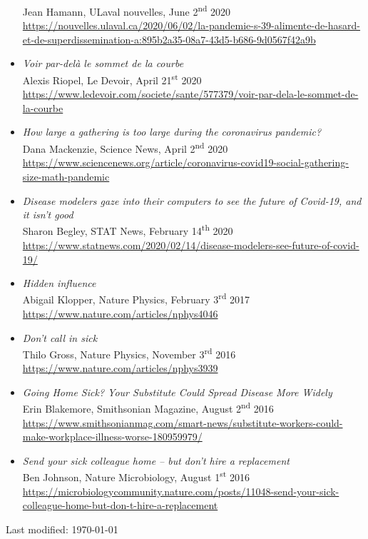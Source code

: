 \documentclass[11pt]{article}
\begin{document}
\begin{itemize}[itemsep=0.5em, first*=\small]
{  {\small Jean Hamann, ULaval nouvelles, June 2\textsuperscript{nd} 2020}\\
  \footnotesize\url{https://nouvelles.ulaval.ca/2020/06/02/la-pandemie-s-39-alimente-de-hasard-et-de-superdissemination-a:895b2a35-08a7-43d5-b686-9d0567f42a9b}}
%
  \item \parbox[t]{0.9\textwidth}{\textit{Voir par-delà le sommet de la courbe}\\
  {\small Alexis Riopel, Le Devoir, April 21\textsuperscript{st} 2020}\\
  \footnotesize\url{https://www.ledevoir.com/societe/sante/577379/voir-par-dela-le-sommet-de-la-courbe}}
%
  \item \parbox[t]{0.9\textwidth}{\textit{How large a gathering is too large during the coronavirus pandemic?}\\
  {\small Dana Mackenzie, Science News, April 2\textsuperscript{nd} 2020}\\
  \footnotesize\url{https://www.sciencenews.org/article/coronavirus-covid19-social-gathering-size-math-pandemic}}
%
  \item \parbox[t]{0.9\textwidth}{\textit{Disease modelers gaze into their computers to see the future of Covid-19, and it isn’t good}\\
  {\small Sharon Begley, STAT News, February 14\textsuperscript{th} 2020}\\
  \footnotesize\url{https://www.statnews.com/2020/02/14/disease-modelers-see-future-of-covid-19/}}
%
  \item \parbox[t]{0.9\textwidth}{\textit{Hidden influence}\\
  {\small Abigail Klopper, Nature Physics, February 3\textsuperscript{rd} 2017}\\
  \footnotesize\url{https://www.nature.com/articles/nphys4046}}
%
  \item \parbox[t]{0.9\textwidth}{\textit{Don't call in sick}\\
  {\small Thilo Gross, Nature Physics, November 3\textsuperscript{rd} 2016}\\
  \footnotesize\url{https://www.nature.com/articles/nphys3939}}
%
  \item \parbox[t]{0.9\textwidth}{\textit{Going Home Sick? Your Substitute Could Spread Disease More Widely}\\
  {\small Erin Blakemore, Smithsonian Magazine, August 2\textsuperscript{nd} 2016}\\
  \footnotesize\url{https://www.smithsonianmag.com/smart-news/substitute-workers-could-make-workplace-illness-worse-180959979/}}
%
  \item \parbox[t]{0.9\textwidth}{\textit{Send your sick colleague home -- but don’t hire a replacement}\\
  {\small Ben Johnson, Nature Microbiology, August 1\textsuperscript{st} 2016}\\
  \footnotesize\url{https://microbiologycommunity.nature.com/posts/11048-send-your-sick-colleague-home-but-don-t-hire-a-replacement}}
%
\end{itemize}
%
%
%
%
%
\vfill
%
\begin{flushright}
  \tiny Last modified: \today
\end{flushright}
%
\end{document}
